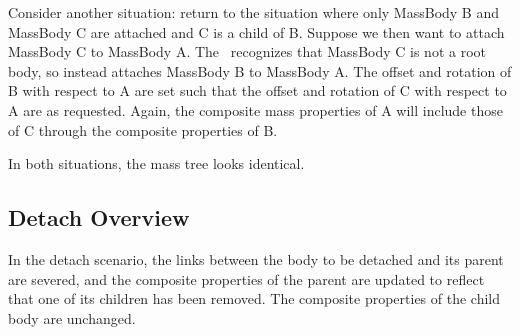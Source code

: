 Consider another situation: return to the situation where only MassBody B and 
MassBody C are attached and C is a child of B.  
Suppose we then want to attach MassBody C to MassBody A.  The \ModelDesc\ 
recognizes that MassBody C is not a root body, so instead attaches MassBody B 
to MassBody A.  The offset and rotation of B with respect to A are set such 
that the offset and rotation of C with respect to A are as requested.  Again,
the composite mass properties of A will include those of C through the 
composite properties of B.

In both situations, the mass tree looks identical.

\subsection{Detach Overview}
In the detach scenario, the links between the body to be detached and its 
parent are severed, and the composite properties of the parent are updated to 
reflect that one of its children has been removed.  The composite properties 
of the child body are unchanged.
\clearpage
\boilerplateinventory
